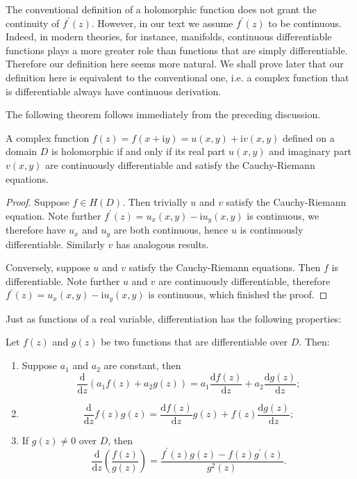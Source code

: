 The conventional definition of a holomorphic function does not grant the continuity of $f^\prime(z)$. However, in our text we assume $f^\prime(z)$ to be continuous. Indeed, in modern theories, for instance, manifolds, continuous differentiable functions plays a more greater role than functions that are simply differentiable. Therefore our definition here seems more natural. We shall prove later that our definition here is equivalent to the conventional one, i.e. a complex function that is differentiable always have continuous derivation.\par
The following theorem follows immediately from the preceding discussion.
\begin{theorem}
A complex function $f(z)=f(x+\mathrm{i}y)=u(x,y)+\mathrm{i}v(x,y)$ defined on a domain $D$ is holomorphic if and only if its real part $u(x,y)$ and imaginary part $v(x,y)$ are continuously differentiable and satisfy the Cauchy-Riemann equations.
\end{theorem}
\begin{proof}
Suppose $f\in H(D)$. Then trivially $u$ and $v$ satisfy the Cauchy-Riemann equation. Note further $f^{\prime}\left( z \right) =u_x\left( x,y \right) -\mathrm{i}u_y\left( x,y \right) $ is continuous, we therefore have $u_x$ and $u_y$ are both continuous, hence $u$ is continuously differentiable. Similarly $v$ has analogous results.\par
Conversely, suppose $u$ and $v$ satisfy the Cauchy-Riemann equations. Then $f$ is differentiable. Note further $u$ and $v$ are continuously differentiable, therefore $f^{\prime}\left( z \right) =u_x\left( x,y \right) -\mathrm{i}u_y\left( x,y \right) $ is continuous, which finished the proof.
\end{proof}
Just as functions of a real variable, differentiation has the following properties:
\begin{proposition}
Let $f(z)$ and $g(z)$ be two functions that are differentiable over $D$. Then: 
\begin{enumerate}
    \item Suppose $a_1$ and $a_2$ are constant, then 
    $$
    \frac{\mathrm{d}}{\mathrm{d}z}\left( a_1f\left( z \right) +a_2g\left( z \right) \right) =a_1\frac{\mathrm{d}f\left( z \right)}{\mathrm{d}z}+a_2\frac{\mathrm{d}g\left( z \right)}{\mathrm{d}z};
    $$
    \item 
    $$
    \frac{\mathrm{d}}{\mathrm{d}z}f\left( z \right) g\left( z \right) =\frac{\mathrm{d}f\left( z \right)}{\mathrm{d}z}g\left( z \right) +f\left( z \right) \frac{\mathrm{d}g\left( z \right)}{\mathrm{d}z};
    $$
    \item If $g(z)\ne 0$ over $D$, then 
    $$
    \frac{\mathrm{d}}{\mathrm{d}z}\left( \frac{f\left( z \right)}{g\left( z \right)} \right) =\frac{f^{\prime}\left( z \right) g\left( z \right) -f\left( z \right) g^{\prime}\left( z \right)}{g^2\left( z \right)}.
    $$
\end{enumerate}
\end{proposition}

